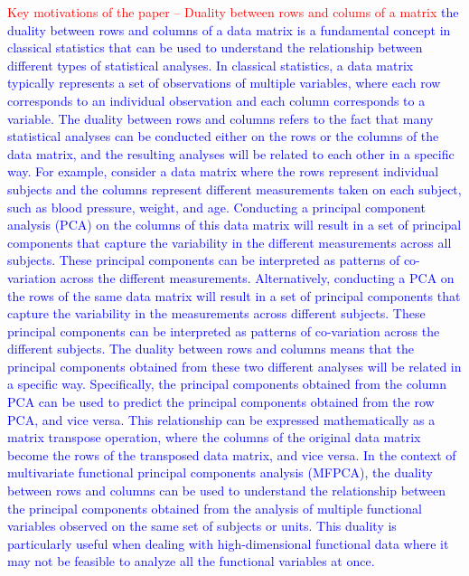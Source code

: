 \textcolor{red}{Key motivations of the paper -- Duality between rows and colums of a matrix}
\textcolor{blue}{the duality between rows and columns of a data matrix is a fundamental concept in classical statistics that can be used to understand the relationship between different types of statistical analyses.
In classical statistics, a data matrix typically represents a set of observations of multiple variables, where each row corresponds to an individual observation and each column corresponds to a variable. The duality between rows and columns refers to the fact that many statistical analyses can be conducted either on the rows or the columns of the data matrix, and the resulting analyses will be related to each other in a specific way.
For example, consider a data matrix where the rows represent individual subjects and the columns represent different measurements taken on each subject, such as blood pressure, weight, and age. Conducting a principal component analysis (PCA) on the columns of this data matrix will result in a set of principal components that capture the variability in the different measurements across all subjects. These principal components can be interpreted as patterns of co-variation across the different measurements.
Alternatively, conducting a PCA on the rows of the same data matrix will result in a set of principal components that capture the variability in the measurements across different subjects. These principal components can be interpreted as patterns of co-variation across the different subjects.
The duality between rows and columns means that the principal components obtained from these two different analyses will be related in a specific way. Specifically, the principal components obtained from the column PCA can be used to predict the principal components obtained from the row PCA, and vice versa. This relationship can be expressed mathematically as a matrix transpose operation, where the columns of the original data matrix become the rows of the transposed data matrix, and vice versa.
In the context of multivariate functional principal components analysis (MFPCA), the duality between rows and columns can be used to understand the relationship between the principal components obtained from the analysis of multiple functional variables observed on the same set of subjects or units. This duality is particularly useful when dealing with high-dimensional functional data where it may not be feasible to analyze all the functional variables at once.}
